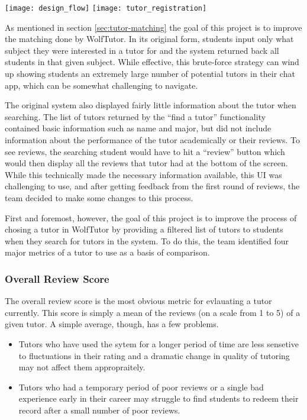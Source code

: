 \begin{figure*}[ht]
  \centering
    \texttt{[image: design\_flow]}
    \texttt{[image: tutor\_registration]}
    \label{fig:scatterplot}
\end{figure*}
As mentioned in section \ref{sec:tutor-matching} the goal of this project is to
improve the matching done by WolfTutor.  In its original form, students input
only what subject they were interested in a tutor for and the system returned
back all students in that given subject.  While effective, this brute-force
strategy can wind up showing students an extremely large number of potential
tutors in their chat app, which can be somewhat challenging to navigate.

The original system also displayed fairly little information about the tutor
when searching.  The list of tutors returned by the ``find a tutor''
functionality contained basic information such as name and major, but did not
include information about the performance of the tutor academically or their
reviews.  To see reviews, the searching student would have to hit a ``review''
button which would then display all the reviews that tutor had at the bottom of
the screen. While this technically made the necessary information available,
this UI was challenging to use, and after getting feedback from the first round
of reviews, the team decided to make some changes to this process.  

First and foremost, however, the goal of this project is to improve the process
of chosing a tutor in WolfTutor by providing a filtered list of tutors to
students when they search for tutors in the system.  To do this, the team
identified four major metrics of a tutor to use as a basis of comparison.

\subsubsection{Overall Review Score}
The overall review score is the most obvious metric for evlauating a tutor
currently.  This score is simply a mean of the reviews (on a scale from 1 to
5) of a given tutor.  A simple average, though, has a few problems.
\begin{itemize}
\item Tutors who have used the sytem for a longer period of time are less
  sensetive to fluctuations in their rating and a dramatic change in quality
  of tutoring may not affect them appropraitely.
\item Tutors who had a temporary period of poor reviews or a single bad
  experience early in their career may struggle to find students to redeem
  their record after a small number of poor reviews.  
\end{itemize}

